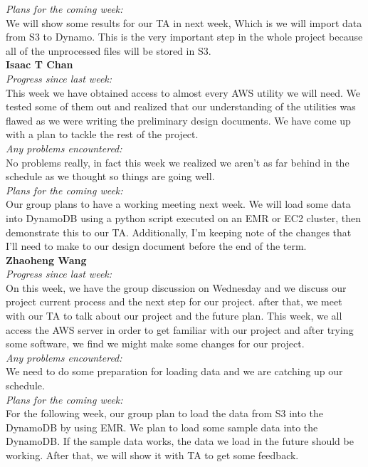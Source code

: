 \noindent\textit{Plans for the coming week:}\\
We will show some results for our TA in next week, Which is we will import data from S3 to Dynamo. This is the very important step in the whole project because all of the unprocessed files will be stored in S3.\\

\noindent\textbf{Isaac T Chan}\\
\noindent\textit{Progress since last week:}\\
This week we have obtained access to almost every AWS utility we will need. We tested some of them out and realized that our understanding of the utilities was flawed as we were writing the preliminary design documents. We have come up with a plan to tackle the rest of the project.\\

\noindent\textit{Any problems encountered:}\\
No problems really, in fact this week we realized we aren't as far behind in the schedule as we thought so things are going well.\\

\noindent\textit{Plans for the coming week:}\\
Our group plans to have a working meeting next week. We will load some data into DynamoDB using a python script executed on an EMR or EC2 cluster, then demonstrate this to our TA. Additionally, I'm keeping note of the changes that I'll need to make to our design document before the end of the term.\\

\noindent\textbf{Zhaoheng Wang}\\
\noindent\textit{Progress since last week:}\\
On this week, we have the group discussion on Wednesday and we discuss our project current process and the next step for our project. after that, we meet with our TA to talk about our project and the future plan. This week, we all access the AWS server in order to get familiar with our project and after trying some software, we find we might make some changes for our project.\\

\noindent\textit{Any problems encountered:}\\
We need to do some preparation for loading data and we are catching up our schedule.\\

\noindent\textit{Plans for the coming week:}\\
For the following week, our group plan to load the data from S3 into the DynamoDB by using EMR. We plan to load some sample data into the DynamoDB. If the sample data works, the data we load in the future should be working. After that, we will show it with TA to get some feedback.\\

